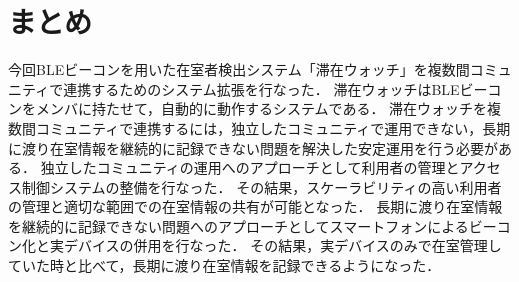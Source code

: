 



\section{まとめ}

今回BLEビーコンを用いた在室者検出システム「滞在ウォッチ」を複数間コミュニティで連携するためのシステム拡張を行なった．
滞在ウォッチはBLEビーコンをメンバに持たせて，自動的に動作するシステムである．
滞在ウォッチを複数間コミュニティで連携するには，独立したコミュニティで運用できない，長期に渡り在室情報を継続的に記録できない問題を解決した安定運用を行う必要がある．
独立したコミュニティの運用へのアプローチとして利用者の管理とアクセス制御システムの整備を行なった．
その結果，スケーラビリティの高い利用者の管理と適切な範囲での在室情報の共有が可能となった．
長期に渡り在室情報を継続的に記録できない問題へのアプローチとしてスマートフォンによるビーコン化と実デバイスの併用を行なった．
その結果，実デバイスのみで在室管理していた時と比べて，長期に渡り在室情報を記録できるようになった．